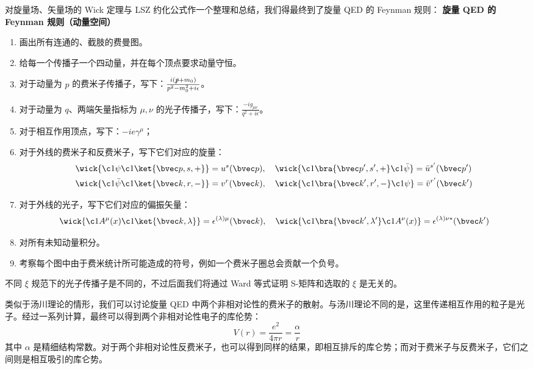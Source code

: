 
对旋量场、矢量场的 Wick 定理与 LSZ 约化公式作一个整理和总结，我们得最终到了旋量 QED 的 Feynman 规则：
\textbf{旋量 QED 的 Feynman 规则（动量空间）}
\begin{enumerate}
\item 画出所有连通的、截肢的费曼图。
\item 给每一个传播子一个四动量，并在每个顶点要求动量守恒。
\item 对于动量为 $p$ 的费米子传播子，写下：$\frac{i(\slashed p+m_0)}{p^2-m_0^2 + i\epsilon}$。
\item 对于动量为 $q$、两端矢量指标为 $\mu,\nu$ 的光子传播子，写下：$\frac{-ig_{\mu\nu}}{q^2 + i\epsilon}$。
\item 对于相互作用顶点，写下：$-ie\gamma^\mu$；
\item 对于外线的费米子和反费米子，写下它们对应的旋量：
\begin{align*}
&\wick{\c1\psi\c1{\ket{\bvec p,s,+}}}=u^s(\bvec p),\quad \wick{\c1{\bra{\bvec p',s',+}} \c1{\bar\psi}}=\bar u^{s'}(\bvec p')\\
&\wick{\c1{\bar\psi}\c1{\ket{\bvec k,r,-}}}=v^{r}(\bvec k),\quad \wick{\c1{\bra{\bvec k',r',-}} \c1\psi}=\bar v^{r'}(\bvec k')
\end{align*}
\item 对于外线的光子，写下它们对应的偏振矢量：
\[
\wick{\c1A^\mu(x) \c1{\ket{\bvec k,\lambda}} }=\epsilon^{(\lambda)\mu}(\bvec k),\quad \wick{\c1{\bra{\bvec k',\lambda'}}\c1A^\nu(x) }=\epsilon^{(\lambda)\nu*}(\bvec k')
\]
\item 
对所有未知动量积分。
\item 
考察每个图中由于费米统计所可能造成的符号，例如一个费米子圈总会贡献一个负号。
\end{enumerate}
不同 $\xi$ 规范下的光子传播子是不同的，不过后面我们将通过 Ward 等式证明 S-矩阵和选取的 $\xi$ 是无关的。

类似于汤川理论的情形，我们可以讨论旋量 QED 中两个非相对论性的费米子的散射。与汤川理论不同的是，这里传递相互作用的粒子是光子。经过一系列计算，最终可以得到两个非相对论性电子的库伦势：
\[
V(r)=\frac{e^2}{4\pi r}=\frac{\alpha}{r}
\]
其中 $\alpha$ 是精细结构常数。对于两个非相对论性反费米子，也可以得到同样的结果，即相互排斥的库仑势；而对于费米子与反费米子，它们之间则是相互吸引的库仑势。
